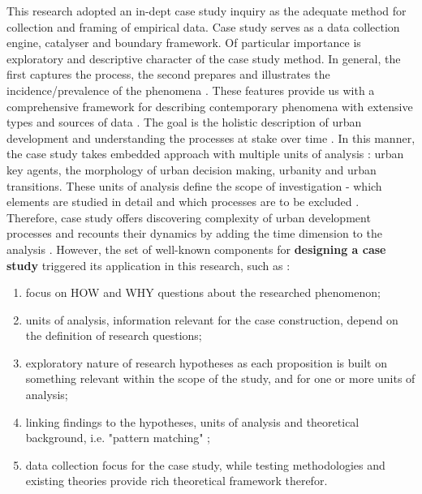 \documentclass[11pt]{report}
\begin{document}
This research adopted an in-dept case study inquiry as the adequate method for collection and framing of empirical data. Case study serves as a data collection engine, catalyser and boundary framework. Of particular importance is exploratory and descriptive character of the case study method. In general, the first captures the process, the second prepares and illustrates the incidence/prevalence of the phenomena . These features provide us with a comprehensive framework for describing contemporary phenomena with extensive types and sources of data . The goal is the holistic description of urban development and understanding the processes at stake over time . In this manner, the case study takes embedded approach with multiple units of analysis : urban key agents, the morphology of urban decision making, urbanity and urban transitions. These units of analysis define the scope of investigation - which elements are studied in detail and which processes are to be excluded .
\\
Therefore, case study offers discovering complexity of urban development processes and recounts their dynamics by adding the time dimension to the analysis . However, the set of well-known components for \textbf{designing a case study} triggered its application in this research, such as :
\begin{enumerate}
\item focus on HOW and WHY questions about the researched phenomenon;
\item units of analysis, information relevant for the case construction, depend on the definition of research questions;
\item exploratory nature of research hypotheses as each proposition is built on something relevant within the scope of the study, and for one or more units of analysis;
\item linking findings to the hypotheses, units of analysis and theoretical background, i.e. "pattern matching" ;
\item data collection focus for the case study, while testing methodologies and existing theories provide rich theoretical framework therefor.
\end{enumerate}
\end{document}
